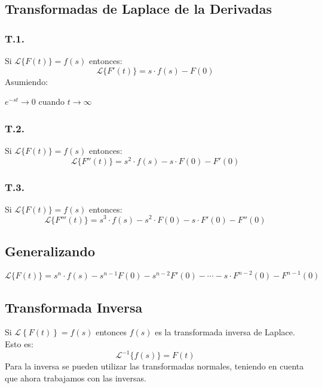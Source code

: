 \subsection*{Transformadas de Laplace de la Derivadas}
\subsubsection*{T.1.}
Si $\mathscr{L} \lbrace F(t) \rbrace = f(s)$ entonces:
$$\mathscr{L} \lbrace F'(t) \rbrace = s\cdot f(s) - F(0)$$
Asumiendo:
\begin{center}
$e^{-st} \to 0$ cuando $t\to\infty$
\end{center}
\subsubsection*{T.2.}
Si $\mathscr{L} \lbrace F(t) \rbrace = f(s)$ entonces:
$$\mathscr{L} \lbrace F''(t) \rbrace = s^2\cdot f(s) - s\cdot F(0)-F'(0)$$
\subsubsection*{T.3.}
Si $\mathscr{L} \lbrace F(t) \rbrace = f(s)$ entonces:
$$\mathscr{L} \lbrace F'''(t) \rbrace = s^3\cdot f(s) - s^2 \cdot F(0)-s\cdot F'(0)-F''(0)$$
\subsection*{Generalizando}
$$\mathscr{L} \lbrace F(t) \rbrace = s^n\cdot f(s)-s^{n-1}F(0)-s^{n-2}F'(0)-\cdots -s\cdot F^{n-2}(0)-F^{n-1}(0)$$
\subsection*{Transformada Inversa}
Si $\mathscr{L}\left\lbrace F(t) \right\rbrace = f(s)$ entonces $f(s)$ es la transformada inversa de Laplace. Esto es:
$$\mathscr{L}^{-1} \lbrace f(s) \rbrace = F(t)$$
Para la inversa se pueden utilizar las transformadas normales, teniendo en cuenta que ahora trabajamos con las inversas.